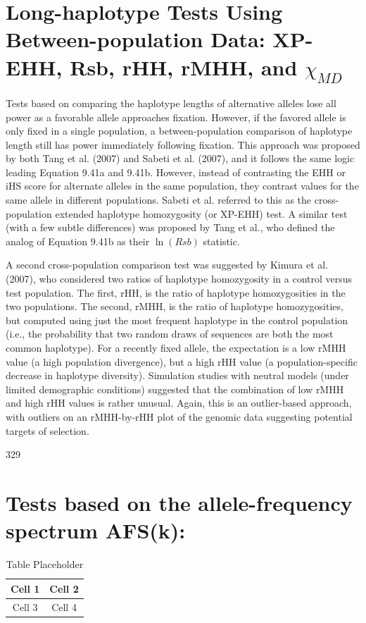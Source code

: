 \documentclass{article}
\begin{document}
\section{Long-haplotype Tests Using Between-population Data: XP-EHH, Rsb, rHH, rMHH, and  $ \chi_{MD} $}
Tests based on comparing the haplotype lengths of alternative alleles lose all power as a favorable allele approaches fixation. However, if the favored allele is only fixed in a single population, a between-population comparison of haplotype length still has power immediately following fixation. This approach was proposed by both Tang et al. (2007) and Sabeti et al. (2007), and it follows the same logic leading Equation 9.41a and 9.41b. However, instead of contrasting the EHH or iHS score for alternate alleles in the same population, they contrast values for the same allele in different populations. Sabeti et al. referred to this as the cross-population extended haplotype homozygosity (or XP-EHH) test. A similar test (with a few subtle differences) was proposed by Tang et al., who defined the analog of Equation 9.41b as their  $ \ln(Rsb) $ statistic.

A second cross-population comparison test was suggested by Kimura et al. (2007), who considered two ratios of haplotype homozygosity in a control versus test population. The first, rHH, is the ratio of haplotype homozygosities in the two populations. The second, rMHH, is the ratio of haplotype homozygosities, but computed using just the most frequent haplotype in the control population (i.e., the probability that two random draws of sequences are both the most common haplotype). For a recently fixed allele, the expectation is a low rMHH value (a high population divergence), but a high rHH value (a population-specific decrease in haplotype diversity). Simulation studies with neutral models (under limited demographic conditions) suggested that the combination of low rMHH and high rHH values is rather unusual. Again, this is an outlier-based approach, with outliers on an rMHH-by-rHH plot of the genomic data suggesting potential targets of selection.

329

\section{Tests based on the allele-frequency spectrum AFS(k):}
\begin{table}[h]
\centering
\begin{tabular}{|c|c|}
\hline
Cell 1 & Cell 2 \\
\hline
Cell 3 & Cell 4 \\
\hline
\end{tabular}
\caption{Table Placeholder}
\end{table}
\end{document}
